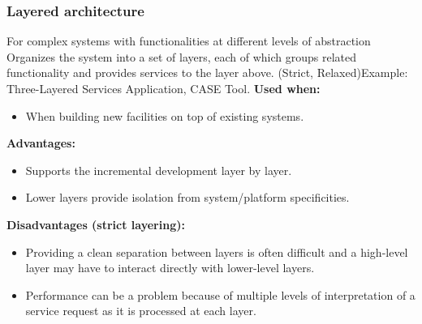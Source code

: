 \documentclass[../ESOF_notes.tex]{subfiles}
\begin{document}
\subsubsection{Layered architecture}  For complex systems with functionalities at different levels of abstraction\newline\newline
Organizes the system into a set of layers, each of which groups related functionality and provides services to the layer above. (Strict, Relaxed)\newline Example: Three-Layered Services Application, CASE Tool. \newline\newline
\textbf{Used when:}
\begin{itemize}
    \item When building new facilities on top of existing systems.
\end{itemize}
\textbf{Advantages:}
\begin{itemize}
    \item Supports the incremental development layer by layer.
    \item Lower layers provide isolation from system/platform specificities.
\end{itemize}
\textbf{Disadvantages (strict layering):}
\begin{itemize}
    \item Providing a clean separation between layers is often difficult and a high-level layer may have to interact directly with lower-level layers.
    \item Performance can be a problem because of multiple levels of interpretation of a service request as it is processed at each layer.
\end{itemize}
\end{document}
